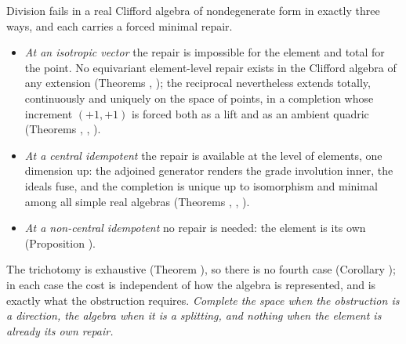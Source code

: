Division fails in a real Clifford algebra of nondegenerate form in exactly three ways, and each carries a forced minimal repair.
\begin{itemize}
\item \emph{At an isotropic vector} the repair is impossible for the element and total for the point. No equivariant element-level repair exists in the Clifford algebra of any extension (Theorems , ); the reciprocal nevertheless extends totally, continuously and uniquely on the space of points, in a completion whose increment $(+1,+1)$ is forced both as a lift and as an ambient quadric (Theorems , , ).
\item \emph{At a central idempotent} the repair is available at the level of elements, one dimension up: the adjoined generator renders the grade involution inner, the ideals fuse, and the completion is unique up to isomorphism and minimal among all simple real algebras (Theorems , , ).
\item \emph{At a non-central idempotent} no repair is needed: the element is its own (Proposition ).
\end{itemize}
The trichotomy is exhaustive (Theorem ), so there is no fourth case (Corollary ); in each case the cost is independent of how the algebra is represented, and is exactly what the obstruction requires. \emph{Complete the space when the obstruction is a direction, the algebra when it is a splitting, and nothing when the element is already its own repair.}
